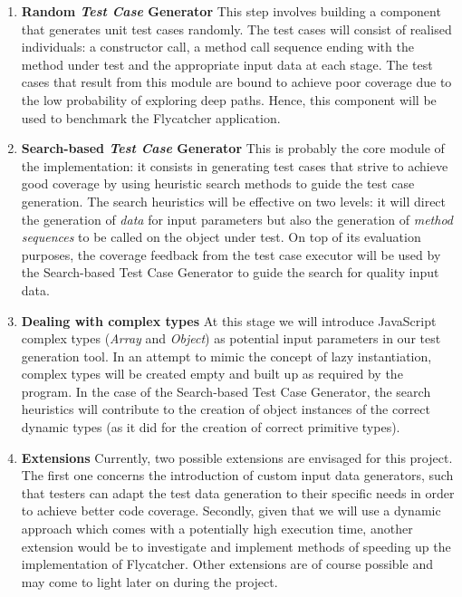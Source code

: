 \documentclass[a4paper,11pt,titlepage]{report}
\begin{document}
\begin{enumerate}
	\item{\textbf{Random \emph{Test Case} Generator}} This step involves building a component that generates unit test cases randomly. The test cases will consist of realised individuals: a constructor call, a method call sequence ending with the method under test and the appropriate input data at each stage. The test cases that result from this module are bound to achieve poor coverage due to the low probability of exploring deep paths. Hence, this component will be used to benchmark the \textsf{Flycatcher} application.
	

	\item{\textbf{Search-based \emph{Test Case} Generator}} This is probably the core module of the implementation: it consists in generating test cases that strive to achieve good coverage by using heuristic search methods to guide the test case generation. The search heuristics will be effective on two levels: it will direct the generation of \emph{data} for input parameters but also the generation of \emph{method sequences} to be called on the object under test. On top of its evaluation purposes, the coverage feedback from the test case executor will be used by the Search-based Test Case Generator to guide the search for quality input data.

	\item{\textbf{Dealing with complex types}}
At this stage we will introduce JavaScript complex types (\emph{Array} and \emph{Object}) as potential input parameters in our test generation tool. In an attempt to mimic the concept of lazy instantiation, complex types will be created empty and built up as required by the program. In the case of the Search-based Test Case Generator, the search heuristics will contribute to the creation of object instances of the correct dynamic types (as it did for the creation of correct primitive types).
		
	\item{\textbf{Extensions}} Currently, two possible extensions are envisaged for this project. The first one concerns the introduction of custom input data generators, such that testers can adapt the test data generation to their specific needs in order to achieve better code coverage. Secondly, given that we will use a dynamic approach which comes with a potentially high execution time, another extension would be to investigate and implement methods of speeding up the implementation of \textsf{Flycatcher}. Other extensions are of course possible and may come to light later on during the project.
		

\end{enumerate}
\end{document}

